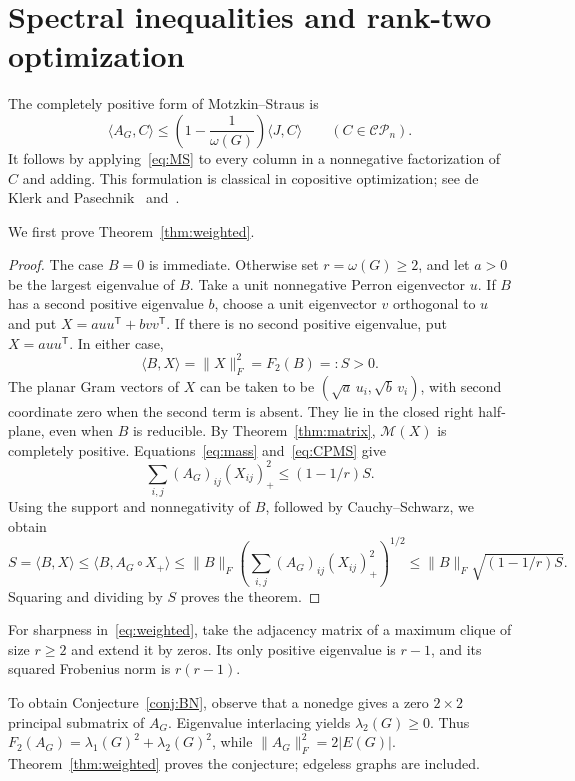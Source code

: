 \documentclass[11pt]{article}
\theoremstyle{remark}
\newcommand{\CP}{\mathcal{CP}}
\newcommand{\M}{\mathcal M}
\newcommand{\F}{F_2}
\newcommand{\ip}[2]{\langle #1,#2\rangle}
\newcommand{\fro}[1]{\lVert #1\rVert_F}
\begin{document}
\section{Spectral inequalities and rank-two optimization}\label{sec:spectral}

The completely positive form of Motzkin--Straus is
\begin{equation}\label{eq:CPMS}
 \ip{A_G}{C}\le\left(1-\frac1{\omega(G)}\right)\ip{J}{C}
 \qquad(C\in\CP_n).
\end{equation}
It follows by applying~\eqref{eq:MS} to every column in a nonnegative
factorization of $C$ and adding. This formulation is classical in copositive
optimization; see de Klerk and Pasechnik~\cite{dKP} and~\cite{CSZ}.

We first prove Theorem~\ref{thm:weighted}.
\begin{proof}
The case $B=0$ is immediate. Otherwise set $r=\omega(G)\ge2$, and let
$a>0$ be the largest eigenvalue of $B$. Take a unit nonnegative Perron
eigenvector $u$. If $B$ has a second positive eigenvalue $b$, choose a unit
eigenvector $v$ orthogonal to $u$ and put
$X=auu^{\mathsf T}+bvv^{\mathsf T}$.
If there is no second positive eigenvalue, put $X=auu^{\mathsf T}$.
In either case,
\[
 \ip{B}{X}=\fro{X}^2=\F(B)=:S>0.
\]
The planar Gram vectors of $X$ can be taken to be
$(\sqrt a\,u_i,\sqrt b\,v_i)$, with second coordinate zero when the second
term is absent. They lie in the closed right half-plane, even when $B$ is
reducible. By Theorem~\ref{thm:matrix}, $\M(X)$ is completely positive.
Equations~\eqref{eq:mass} and~\eqref{eq:CPMS} give
\[
 \sum_{i,j}(A_G)_{ij}(X_{ij})_+^2\le(1-1/r)S.
\]
Using the support and nonnegativity of $B$, followed by Cauchy--Schwarz,
we obtain
\[
 S=\ip{B}{X}\le\ip{B}{A_G\circ X_+}
 \le\fro{B}\left(\sum_{i,j}(A_G)_{ij}(X_{ij})_+^2\right)^{1/2}
 \le\fro{B}\sqrt{(1-1/r)S}.
\]
Squaring and dividing by $S$ proves the theorem.
\end{proof}

For sharpness in~\eqref{eq:weighted}, take the adjacency matrix of a maximum
clique of size $r\ge2$ and extend it by zeros. Its only positive eigenvalue is
$r-1$, and its squared Frobenius norm is $r(r-1)$.

To obtain Conjecture~\ref{conj:BN}, observe that a nonedge gives a zero
$2\times2$ principal submatrix of $A_G$.
Eigenvalue interlacing yields $\lambda_2(G)\ge0$.
Thus $\F(A_G)=\lambda_1(G)^2+\lambda_2(G)^2$, while
$\fro{A_G}^2=2|E(G)|$. Theorem~\ref{thm:weighted} proves the conjecture;
edgeless graphs are included.
\end{document}
